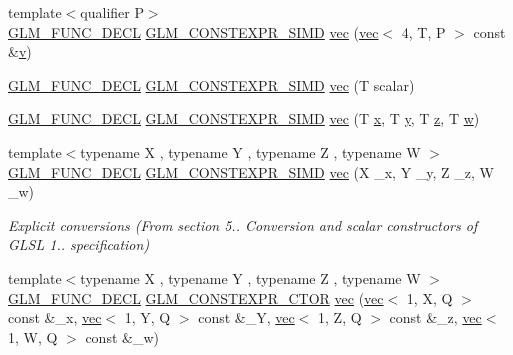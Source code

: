 \begin{DoxyCompactItemize}
{\footnotesize template$<$qualifier P$>$ }\\\mbox{\hyperlink{setup_8hpp_ab2d052de21a70539923e9bcbf6e83a51}{G\+L\+M\+\_\+\+F\+U\+N\+C\+\_\+\+D\+E\+CL}} \mbox{\hyperlink{setup_8hpp_ae5de828d10226b21e2123dd61f3cb5ed}{G\+L\+M\+\_\+\+C\+O\+N\+S\+T\+E\+X\+P\+R\+\_\+\+S\+I\+MD}} \mbox{\hyperlink{structglm_1_1vec_3_014_00_01_t_00_01_q_01_4_a7f8d760e50fc7fb597c88ee4bf5bbcc2}{vec}} (\mbox{\hyperlink{structglm_1_1vec}{vec}}$<$ 4, T, P $>$ const \&\mbox{\hyperlink{_s_d_l__opengl_8h_a10a82eabcb59d2fcd74acee063775f90}{v}})
\item 
\mbox{\hyperlink{setup_8hpp_ab2d052de21a70539923e9bcbf6e83a51}{G\+L\+M\+\_\+\+F\+U\+N\+C\+\_\+\+D\+E\+CL}} \mbox{\hyperlink{setup_8hpp_ae5de828d10226b21e2123dd61f3cb5ed}{G\+L\+M\+\_\+\+C\+O\+N\+S\+T\+E\+X\+P\+R\+\_\+\+S\+I\+MD}} \mbox{\hyperlink{structglm_1_1vec_3_014_00_01_t_00_01_q_01_4_ad2cec87eaf8ded14b0173cef509ecdbb}{vec}} (T scalar)
\item 
\mbox{\hyperlink{setup_8hpp_ab2d052de21a70539923e9bcbf6e83a51}{G\+L\+M\+\_\+\+F\+U\+N\+C\+\_\+\+D\+E\+CL}} \mbox{\hyperlink{setup_8hpp_ae5de828d10226b21e2123dd61f3cb5ed}{G\+L\+M\+\_\+\+C\+O\+N\+S\+T\+E\+X\+P\+R\+\_\+\+S\+I\+MD}} \mbox{\hyperlink{structglm_1_1vec_3_014_00_01_t_00_01_q_01_4_a780f2ba10078d7f0dd8348e288042aac}{vec}} (T \mbox{\hyperlink{_s_d_l__opengl_8h_ad0e63d0edcdbd3d79554076bf309fd47}{x}}, T \mbox{\hyperlink{_s_d_l__opengl_8h_a1675d9d7bb68e1657ff028643b4037e3}{y}}, T \mbox{\hyperlink{_s_d_l__opengl__glext_8h_a5e74030ebb3297ce1b37ff716fedd68f}{z}}, T \mbox{\hyperlink{_s_d_l__opengl__glext_8h_a6ee8f168a7ab6785a9bb57c6715dad99}{w}})
\item 
{\footnotesize template$<$typename X , typename Y , typename Z , typename W $>$ }\\\mbox{\hyperlink{setup_8hpp_ab2d052de21a70539923e9bcbf6e83a51}{G\+L\+M\+\_\+\+F\+U\+N\+C\+\_\+\+D\+E\+CL}} \mbox{\hyperlink{setup_8hpp_ae5de828d10226b21e2123dd61f3cb5ed}{G\+L\+M\+\_\+\+C\+O\+N\+S\+T\+E\+X\+P\+R\+\_\+\+S\+I\+MD}} \mbox{\hyperlink{structglm_1_1vec_3_014_00_01_t_00_01_q_01_4_a5ed4d92395313bc109f2363d8cc29d86}{vec}} (X \+\_\+x, Y \+\_\+y, Z \+\_\+z, W \+\_\+w)
\begin{DoxyCompactList}\small\item\em Explicit conversions (From section 5.. Conversion and scalar constructors of G\+L\+SL 1.. specification) \end{DoxyCompactList}\item 
{\footnotesize template$<$typename X , typename Y , typename Z , typename W $>$ }\\\mbox{\hyperlink{setup_8hpp_ab2d052de21a70539923e9bcbf6e83a51}{G\+L\+M\+\_\+\+F\+U\+N\+C\+\_\+\+D\+E\+CL}} \mbox{\hyperlink{setup_8hpp_ad34178a09666081abdb573c14d1f4a5a}{G\+L\+M\+\_\+\+C\+O\+N\+S\+T\+E\+X\+P\+R\+\_\+\+C\+T\+OR}} \mbox{\hyperlink{structglm_1_1vec_3_014_00_01_t_00_01_q_01_4_ac1010f23f9fb2dce17ac5dcba8a37dab}{vec}} (\mbox{\hyperlink{structglm_1_1vec}{vec}}$<$ 1, X, Q $>$ const \&\+\_\+x, \mbox{\hyperlink{structglm_1_1vec}{vec}}$<$ 1, Y, Q $>$ const \&\+\_\+Y, \mbox{\hyperlink{structglm_1_1vec}{vec}}$<$ 1, Z, Q $>$ const \&\+\_\+z, \mbox{\hyperlink{structglm_1_1vec}{vec}}$<$ 1, W, Q $>$ const \&\+\_\+w)

\end{DoxyCompactItemize}
